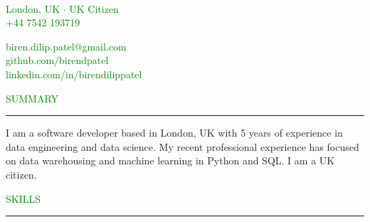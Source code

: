\documentclass [
        11pt
] {article}
\begin{document}
\begin{multicols}{2}

\\
\noindent \textcolor{green}{London, UK $ \boldsymbol{\cdot} $ UK Citizen}\\
\noindent \textcolor{green}{$+$44 7542 193719}\\

\columnbreak

\hspace*{\fill} \noindent \textcolor{green}{biren.dilip.patel@gmail.com}\\
\hspace*{\fill} \noindent \textcolor{green}{github.com/birendpatel}\\
\hspace*{\fill} \noindent \textcolor{green}{linkedin.com/in/birendilippatel}

\end{multicols}


\noindent\textcolor{green}{SUMMARY \rule{16cm}{1pt}}

\vspace*{10pt}

\noindent I am a software developer based in London, UK with 5 years of 
experience in data engineering and data science. My recent
professional experience has focused on data warehousing and machine learning
in Python and SQL.
I am a UK citizen.

\vspace*{10pt}



\noindent\textcolor{green}{SKILLS \rule{17cm}{1pt}}
\end{document}
